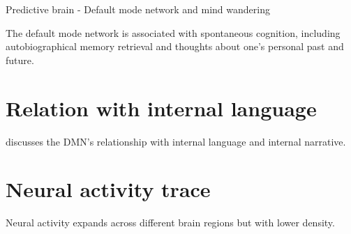 \begin{frame}[allowframebreaks]{Predictive brain - Default mode network and mind wandering}
    
    The default mode network is associated with spontaneous cognition, including autobiographical memory retrieval and thoughts about one’s personal past and future.
    \cite{raichle-2015-the-brains-default-mode-network, andrews-hanna-2010-evidence-for-the-default-networks-role-in-spontaneous-cognition}
    
    
    \section{Relation with internal language}
        \cite{menon-2023-20-years-of-the-default-mode-network-a-review-and-synthesis} discusses the DMN's relationship with internal language and internal narrative.
    
    
    \section{Neural activity trace}
        Neural activity expands across different brain regions but with lower density.
        \cite{alderson-day-2016-the-brains-conversation-with-itself-neural-substrates-of-dialogic-inner-speech}


\end{frame}
